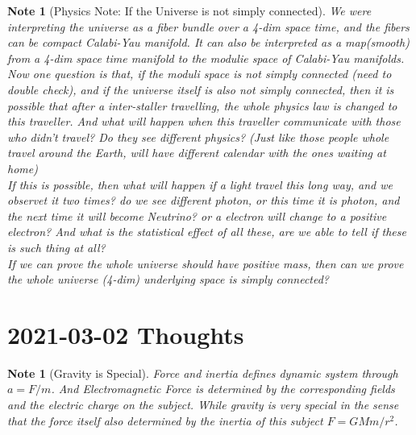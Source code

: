 \documentclass[pdf]{article}
\newtheorem{note}[theorem]{Note}
\begin{document}
\begin{note}[Physics Note: If the Universe is not simply connected]
We were interpreting the universe as a fiber bundle over a 4-dim space time, and the fibers can be compact Calabi-Yau manifold. It can also be interpreted as a map(smooth) from a 4-dim space time manifold to the modulie space of Calabi-Yau manifolds. Now one question is that, if the moduli space is not simply connected (need to double check), and if the universe itself is also not simply connected, then it is possible that after a inter-staller travelling, the whole physics law is changed to this traveller. And what will happen when this traveller communicate with those who didn't travel? Do they see different physics? (Just like those people whole travel around the Earth, will have different calendar with the ones waiting at home)\\
If this is possible, then what will happen if a light travel this long way, and we observet it two times? do we see different photon, or this time it is photon, and the next time it will become Neutrino? or a electron will change to a positive electron? And what is the statistical effect of all these, are we able to tell if these is such thing at all?\\
If we can prove the whole universe should have positive mass, then can we prove the whole universe (4-dim) underlying space is simply connected?
\end{note}

\section{2021-03-02 Thoughts}
\begin{note}[Gravity is Special]
Force and inertia defines dynamic system through $a = F/m$. And Electromagnetic Force is determined by the corresponding fields and the electric charge on the subject. While gravity is very special in the sense that the force itself also determined by the inertia of this subject $F = GMm/r^2$. 
\end{note}
\end{document}

